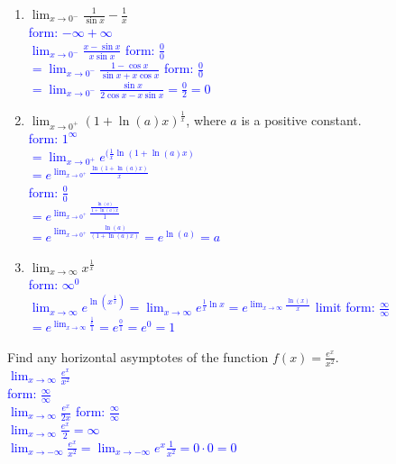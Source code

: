 \documentclass{ximera}
\begin{document}
\begin{exercise}
\begin{enumerate}
    \item $\displaystyle \lim_{x\rightarrow 0^-} \frac{1}{\sin x}-\frac{1}{x}$\\
    \textcolor{blue}{ form: $-\infty+\infty$\\
    $\lim_{x\rightarrow 0^-} \frac{x-\sin x}{x\sin x}$ form: $\frac{0}{0}$\\
    $=\lim_{x\rightarrow 0^-} \frac{1-\cos x}{\sin x+x\cos x}$ form: $\frac{0}{0}$\\
    $=\lim_{x\rightarrow 0^-} \frac{\sin x}{2\cos x-x\sin x}=\frac{0}{2}=0$}

    \item $\displaystyle \lim_{x\rightarrow 0^+} (1+\ln(a)x)^{\frac{1}{x}}$, where $a$ is a positive constant.\\
    \textcolor{blue}{ form: $1^{\infty}$\\
    $=\lim_{x\rightarrow 0^+}e^{(\frac{1}{x}\ln(1+\ln(a)x)}$\\
    $=e^{\lim_{x\rightarrow 0^+}\frac{\ln(1+\ln(a)x)}{x}}$\\
    form: $\frac00$ \\
    $=e^{\lim_{x\rightarrow 0^+}\frac{\frac{\ln(a)}{1+\ln(a)x}}{1}}$\\
    $=e^{\lim_{x\rightarrow 0^+}\frac{\ln(a)}{(1+\ln(a)x)}}=e^{\ln(a)}=a$}

    \item $\displaystyle \lim_{x\rightarrow \infty} x^{\frac{1}{x}}$\\
    \textcolor{blue}{ form: $\infty^0$\\
    $\lim_{x\rightarrow \infty} e^{\ln(x^{\frac{1}{x}})}=\lim_{x\rightarrow \infty} e^{\frac{1}{x}\ln{x}}=e^{\lim_{x\rightarrow \infty} \frac{\ln(x)}{x}}$ limit form: $\frac{\infty}{\infty}$\\
    $=e^{\lim_{x\rightarrow \infty} \frac{\frac{1}{x}}{1}}=e^{\frac{0}{1}}=e^0=1$
    }
\end{enumerate}
\end{exercise}

    
\begin{exercise}    
    Find any horizontal asymptotes of the function $f(x)=\frac{e^x}{x^2}$. \\
    \textcolor{blue}{$\lim_{x\rightarrow \infty} \frac{e^x}{x^2}$\\
    form: $\frac{\infty}{\infty}$\\
    $\lim_{x\rightarrow \infty} \frac{e^x}{2x}$  form: $\frac{\infty}{\infty}$\\
    $\lim_{x\rightarrow \infty} \frac{e^x}{2}=\infty$\\
    $\lim_{x\rightarrow -\infty} \frac{e^x}{x^2}=\lim_{x\rightarrow -\infty} e^x\frac{1}{x^2}=0\cdot 0=0$}
\end{exercise}
\end{document}

